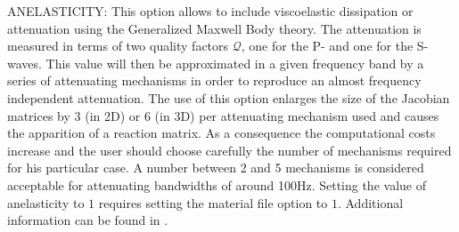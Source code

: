 \documentclass[12pt,twoside]{article}
\def\Q{{\mathcal Q}}
\begin{document}
\noindent
\hypertarget{anelas}{ANELASTICITY}: This option allows to include viscoelastic dissipation or 
attenuation using the Generalized Maxwell Body theory.
The attenuation is measured in terms of two quality factors $\Q$, one for the P- and one for the S-waves.
This value will then be approximated in a given frequency band by a series of attenuating mechanisms in order 
to reproduce an almost frequency independent attenuation.
The use of this option enlarges the size of the Jacobian matrices by $3$ (in 2D) or $6$ (in 3D) per attenuating 
mechanism used and causes the apparition of a reaction matrix.
As a consequence the computational costs increase and the user should choose carefully the number of mechanisms 
required for his particular case.
A number between 2 and 5 mechanisms is considered acceptable for attenuating bandwidths of around 100Hz.
Setting the value of anelasticity to $1$ requires setting the material file option to $1$.
Additional information can be found in \cite{KaeserDumbserPuente07}.\\
\end{document}
